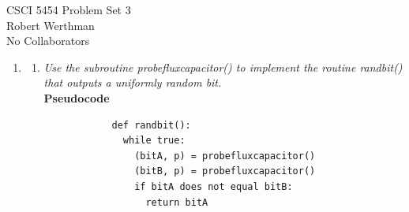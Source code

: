 \documentclass[12pt]{article}
\begin{document}
CSCI 5454 \hfill Problem Set 3\\
Robert Werthman\\
No Collaborators\\

\hrulefill

\begin{enumerate}
	\item
		\begin{enumerate}
			\item \textit{Use the subroutine probefluxcapacitor() to implement the routine randbit() that outputs a uniformly random bit.}\\
			
			\textbf{Pseudocode}
			\begin{verbatim}
			def randbit():
			  while true:
			    (bitA, p) = probefluxcapacitor()
			    (bitB, p) = probefluxcapacitor()
			    if bitA does not equal bitB:
			      return bitA
			
			\end{verbatim}
			

\end{enumerate}
\end{enumerate}
\end{document}
